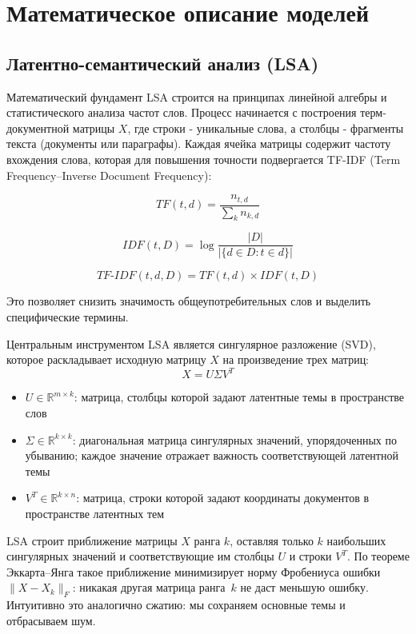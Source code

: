 \section{Математическое описание моделей}

\subsection{Латентно-семантический анализ (LSA)}

Математический фундамент LSA строится на принципах линейной алгебры и
статистического анализа частот слов. Процесс начинается с построения
терм-документной матрицы \( X \), где строки - уникальные слова, а столбцы -
фрагменты текста (документы или параграфы). Каждая ячейка матрицы содержит
частоту вхождения слова, которая для повышения точности подвергается
TF-IDF (Term Frequency–Inverse Document Frequency):

\[
  TF(t, d) = \frac{n_{t,d}}{\sum_{k} n_{k,d}}
\]

\[
  IDF(t, D) = \log \frac{|D|}{|\{d \in D : t \in d\}|}
\]

\[
  TF\text{-}IDF(t, d, D) = TF(t, d) \times IDF(t, D)
\]

Это позволяет снизить значимость общеупотребительных слов и выделить
специфические термины.

Центральным инструментом LSA является сингулярное разложение (SVD), которое
раскладывает исходную матрицу \( X \) на произведение трех матриц:
\[
  X = U \Sigma V^T
\]
\begin{itemize}
  \item \( U \in \mathbb{R}^{m \times k} \): матрица, столбцы которой
    задают латентные темы в пространстве слов
  \item \( \Sigma \in \mathbb{R}^{k \times k} \): диагональная матрица
    сингулярных значений, упорядоченных по убыванию; каждое значение
    отражает важность соответствующей латентной темы
  \item \( V^T \in \mathbb{R}^{k \times n} \): матрица, строки которой
    задают координаты документов в пространстве латентных тем
\end{itemize}

LSA строит приближение матрицы \( X \) ранга \( k \), оставляя
только \( k \) наибольших сингулярных значений и соответствующие им
столбцы \( U \) и строки \( V^T \). По теореме Эккарта--Янга такое
приближение минимизирует норму Фробениуса ошибки
\( \|X - X_k\|_F \): никакая другая матрица ранга~\( k \) не даст
меньшую ошибку. Интуитивно это аналогично сжатию: мы сохраняем
основные темы и отбрасываем шум.

